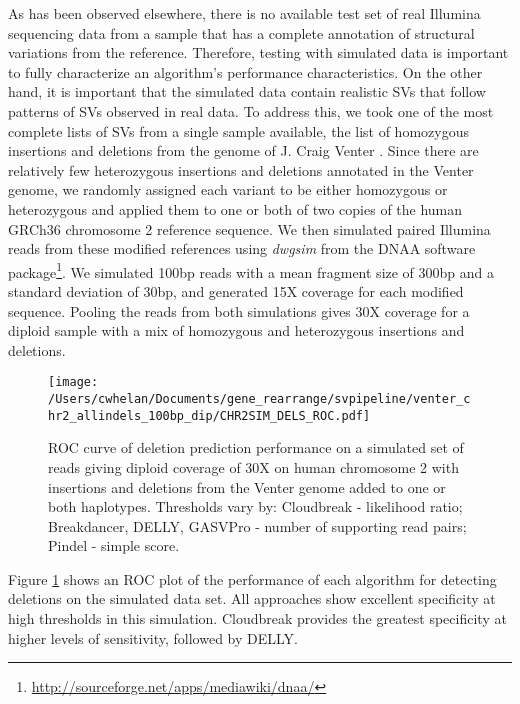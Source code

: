 \documentclass[11pt]{article}
\begin{document}
As has been observed elsewhere, there is no available test set of real Illumina sequencing data from a sample that has a complete annotation of structural variations from the reference. Therefore, testing with simulated data is important to fully characterize an algorithm's performance characteristics. On the other hand, it is important that the simulated data contain realistic SVs that follow patterns of SVs observed in real data. To address this, we took one of the most complete lists of SVs from a single sample available, the list of homozygous insertions and deletions from the genome of J. Craig Venter \autocite{Levy:2007fb}. Since there are relatively few heterozygous insertions and deletions annotated in the Venter genome, we randomly assigned each variant to be either homozygous or heterozygous and applied them to one or both of two copies of the human GRCh36 chromosome 2 reference sequence. We then simulated paired Illumina reads from these modified references using \emph{dwgsim} from the DNAA software package\footnote{\url{http://sourceforge.net/apps/mediawiki/dnaa/}}. We simulated 100bp reads with a mean fragment size of 300bp and a standard deviation of 30bp, and generated 15X coverage for each modified sequence. Pooling the reads from both simulations gives 30X coverage for a diploid sample with a mix of homozygous and heterozygous insertions and deletions.

\begin{figure}[t]
\centering
\texttt{[image: /Users/cwhelan/Documents/gene\_rearrange/svpipeline/venter\_chr2\_allindels\_100bp\_dip/CHR2SIM\_DELS\_ROC.pdf]}
\caption{ROC curve of deletion prediction performance on a simulated set of reads giving diploid coverage of 30X on human chromosome 2 with insertions and deletions from the Venter genome added to one or both haplotypes. Thresholds vary by: Cloudbreak - likelihood ratio; Breakdancer, DELLY, GASVPro - number of supporting read pairs; Pindel - simple score.}
\label{chr2DeletionsRoc}
\end{figure}

Figure \ref{chr2DeletionsRoc} shows an ROC plot of the performance of each algorithm for detecting deletions on the simulated data set. All approaches show excellent specificity at high thresholds in this simulation. Cloudbreak provides the greatest specificity at higher levels of sensitivity, followed by DELLY.  
\end{document}
